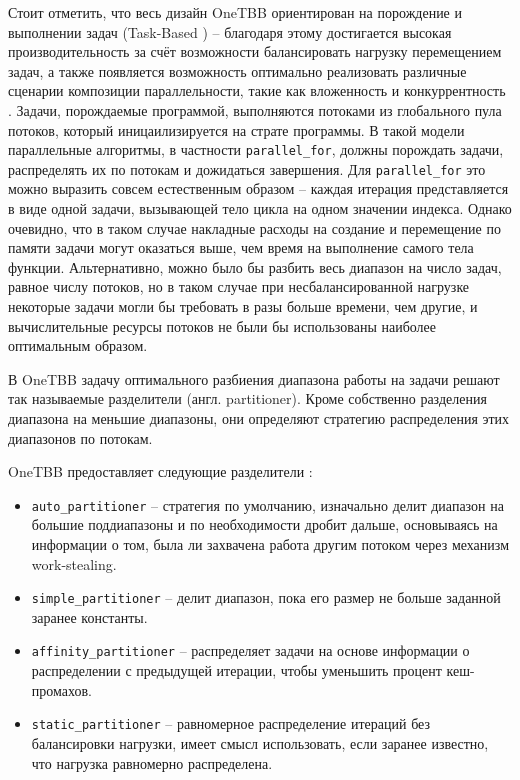 \documentclass[times,specification,annotation]{itmo-student-thesis}
\begin{document}
Стоит отметить, что весь дизайн OneTBB ориентирован на порождение и выполнении задач (Task-Based \cite{tbb-task-based}) -- благодаря этому достигается высокая производительность за счёт возможности балансировать нагрузку перемещением задач, а также появляется возможность оптимально реализовать различные сценарии композиции параллельности, такие как вложенность и конкуррентность \cite{protbb-composability}. Задачи, порождаемые программой, выполняются потоками из глобального пула потоков, который иницаилизируется на страте программы.
В такой модели параллельные алгоритмы, в частности \texttt{parallel\_for}, должны порождать задачи, распределять их по потокам и дожидаться завершения. Для \texttt{parallel\_for} это можно выразить совсем естественным образом -- каждая итерация представляется в виде одной задачи, вызывающей тело цикла на одном значении индекса. Однако очевидно, что в таком случае накладные расходы на создание и перемещение по памяти задачи могут оказаться выше, чем время на выполнение самого тела функции. Альтернативно, можно было бы разбить весь диапазон на число задач, равное числу потоков, но в таком случае при несбалансированной нагрузке некоторые задачи могли бы требовать в разы больше времени, чем другие, и вычислительные ресурсы потоков не были бы использованы наиболее оптимальным образом.

В OneTBB задачу оптимального разбиения диапазона работы на задачи решают так называемые разделители (англ. partitioner).
Кроме собственно разделения диапазона на меньшие диапазоны, они определяют стратегию распределения этих диапазонов по потокам.

OneTBB предоставляет следующие разделители \cite{tbb-partitioners}:
\begin{itemize}
    \item \texttt{auto\_partitioner} -- стратегия по умолчанию, изначально делит диапазон на большие поддиапазоны и по необходимости дробит дальше, основываясь на информации о том, была ли захвачена работа другим потоком через механизм work-stealing.
    \item \texttt{simple\_partitioner} -- делит диапазон, пока его размер не больше заданной заранее константы.
    \item \texttt{affinity\_partitioner} -- распределяет задачи на основе информации о распределении с предыдущей итерации, чтобы уменьшить процент кеш-промахов.
    \item \texttt{static\_partitioner} -- равномерное распределение итераций без балансировки нагрузки, имеет смысл использовать, если заранее известно, что нагрузка равномерно распределена.
\end{itemize}
\end{document}
